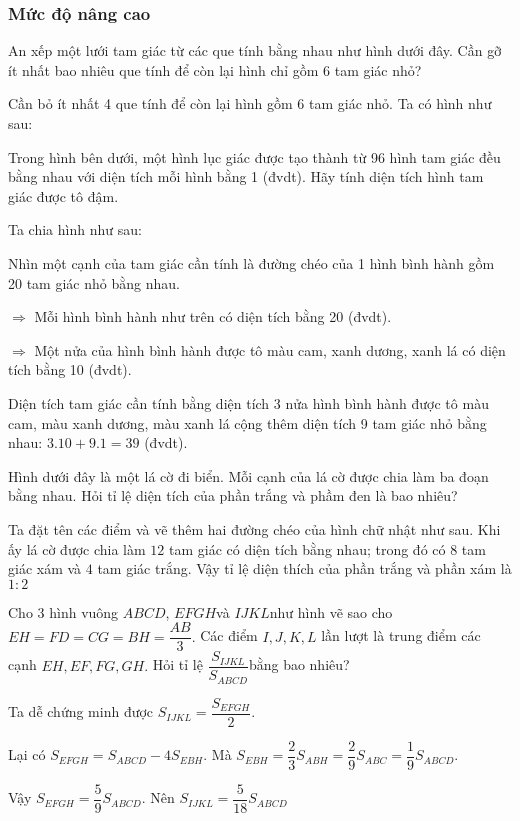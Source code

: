\subsubsection*{Mức độ nâng cao} 
\begin{bt}
	An xếp một lưới tam giác từ các que tính bằng nhau như hình dưới đây. Cần gỡ ít nhất bao nhiêu que tính để còn lại hình chỉ gồm 6 tam giác nhỏ?
	\begin{loigiaichuong38}
		Cần bỏ ít nhất 4 que tính để còn lại hình gồm 6 tam giác nhỏ.
		Ta có hình như sau:
		
	\end{loigiaichuong38}
\end{bt}
\begin{bt}
	Trong hình bên dưới, một hình lục giác được tạo thành từ 96 hình tam giác đều bằng nhau với diện tích mỗi hình bằng 1 (đvdt). Hãy tính diện tích hình tam giác được tô đậm.
	\begin{loigiaichuong38}
		Ta chia hình như sau: 
		
		Nhìn một cạnh của tam giác cần tính là đường chéo của 1 hình bình hành gồm 20 tam giác nhỏ bằng nhau.
		
		$\Rightarrow$ Mỗi hình bình hành như trên có diện tích bằng 20 (đvdt).
		
		$\Rightarrow$ Một nửa của hình bình hành được tô màu cam, xanh dương, xanh lá có diện tích bằng 10 (đvdt).
		
		Diện tích tam giác cần tính bằng diện tích 3 nửa hình bình hành được tô màu cam, màu xanh dương, màu xanh lá cộng thêm diện tích 9 tam giác nhỏ bằng nhau: $3.10+9.1=39$ (đvdt).
	\end{loigiaichuong38}
\end{bt} 
\begin{bt}
	Hình dưới đây là một lá cờ đi biển. Mỗi cạnh của lá cờ được chia làm ba đoạn bằng nhau.  Hỏi tỉ lệ diện tích của phần trắng và phầm đen là bao nhiêu?
	\begin{loigiaichuong38}
		Ta đặt tên các điểm và vẽ thêm hai đường chéo của hình chữ nhật như sau. 
		Khi ấy lá cờ được chia làm $12$ tam giác có diện tích bằng nhau; trong đó có $8$ tam giác xám và $4$ tam giác trắng. Vậy tỉ lệ diện thích của phần trắng và phần xám là $1:2$
	\end{loigiaichuong38}
\end{bt}
\begin{bt}
	Cho $3$ hình vuông $ABCD$, $EFGH$và $IJKL$như hình vẽ sao cho $EH=FD=CG=BH=\dfrac{AB}{3}.$ Các điểm $I,J,K,L$ lần lượt là trung điểm các cạnh $EH,EF,FG,GH.$ Hỏi tỉ lệ $\dfrac{{{S}_{IJKL}}}{{{S}_{ABCD}}}$bằng bao nhiêu?
	\begin{loigiaichuong38}
		Ta dễ chứng minh được ${{S}_{IJKL}}=\dfrac{{{S}_{EFGH}}}{2}.$
		
		Lại có ${{S}_{EFGH}}={{S}_{ABCD}}-4{{S}_{EBH}}$. Mà ${{S}_{EBH}}=\dfrac{2}{3}{{S}_{ABH}}=\dfrac{2}{9}{{S}_{ABC}}=\dfrac{1}{9}{{S}_{ABCD}}.$
		
		Vậy ${{S}_{EFGH}}=\dfrac{5}{9}{{S}_{ABCD}}.$ Nên ${{S}_{IJKL}}=\dfrac{5}{18}{{S}_{ABCD}}$
	\end{loigiaichuong38}
\end{bt}
